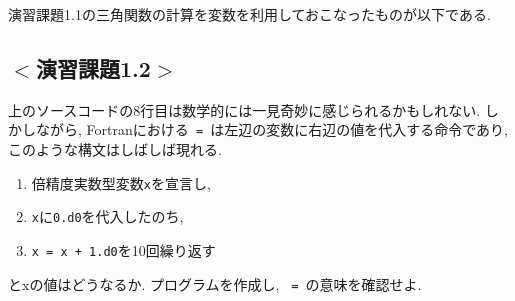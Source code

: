 演習課題1.1の三角関数の計算を変数を利用しておこなったものが以下である. 



\subsection*{$<$演習課題1.2$>$}
上のソースコードの8行目は数学的には一見奇妙に感じられるかもしれない. 
しかしながら, Fortranにおける\verb| = |は左辺の変数に右辺の値を代入する命令であり, 
このような構文はしばしば現れる.  
\begin{enumerate}
\item 倍精度実数型変数\verb|x|を宣言し, 
\item \verb|x|に\verb|0.d0|を代入したのち, 
\item \verb|x = x + 1.d0|を10回繰り返す
\end{enumerate}
とxの値はどうなるか. 
プログラムを作成し, \verb| = |の意味を確認せよ. 
\newline


\begin{comment}
\subsection*{より汎用的な電卓プログラムの作成}
画面上で二つの数値x, yを読み取り, それらをそのまま画面上に表示するプログラムの例を以下に示す.

このプログラムを実行すると, x, yという二つの数値の入力待ちとなるため,
キーボードから任意の数字を入力する.
x=1.2, y=3.14を入力するには,
\begin{Verbatim}[frame=single]
1.2 3.14
\end{Verbatim}
のようにスペースまたは,
\begin{Verbatim}[frame=single]
1.2
3.14
\end{Verbatim}
のようにエンターで区切る.

write文とread文の括弧の中の6と5は,
それぞれ標準出力, 標準入力と呼ばれ, コマンドプロンプトの画面上での入出力を意味する. \\


次に, 画面上で二つの数値x, yを読み取り, それらの和, 差, 積, 商を計算するプログラムを以下に示す.

和差積商はそれぞれ記号$+-*/$で表される.
\\

最後に, 二つの数値をファイルから入力するように変更したプログラムを以下に示す.

プログラムの実行にあたっては, あらかじめ``input.dat''という入力ファイルを準備しておく必要がある.
メモ帳を用いて, ファイル``input.dat''をソースコードと同じフォルダ内に作成し, 例えば次のように入力しておくこと.
\begin{Verbatim}[frame=single]
1.2 3.14
\end{Verbatim}
\end{comment}

